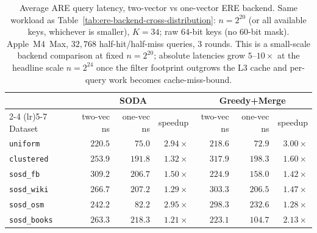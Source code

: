 \begin{table}[H]
    \centering
    \setlength{\tabcolsep}{5pt}
    \small
    \begin{tabular}{@{}lrrrrrr@{}}
        \toprule
        & \multicolumn{3}{c}{SODA} & \multicolumn{3}{c}{Greedy+Merge} \\
        \cmidrule(lr){2-4} \cmidrule(lr){5-7}
        Dataset
        & two-vec ns & one-vec ns & speedup
        & two-vec ns & one-vec ns & speedup \\
        \midrule
        \texttt{uniform}     & $220.5$ & $75.0$  & $2.94\times$ & $218.6$ & $72.9$  & $3.00\times$ \\
        \texttt{clustered}   & $253.9$ & $191.8$ & $1.32\times$ & $317.9$ & $198.3$ & $1.60\times$ \\
        \texttt{sosd\_fb}    & $309.2$ & $206.7$ & $1.50\times$ & $224.9$ & $158.0$ & $1.42\times$ \\
        \texttt{sosd\_wiki}  & $266.7$ & $207.2$ & $1.29\times$ & $303.3$ & $206.5$ & $1.47\times$ \\
        \texttt{sosd\_osm}   & $242.2$ & $82.2$  & $2.95\times$ & $298.3$ & $232.6$ & $1.28\times$ \\
        \texttt{sosd\_books} & $263.3$ & $218.3$ & $1.21\times$ & $223.1$ & $104.7$ & $2.13\times$ \\
        \bottomrule
    \end{tabular}
    \caption{Average ARE query latency, two-vector vs one-vector ERE backend.
    Same workload as Table~\ref{tab:ere-backend-cross-distribution}:
        $n = 2^{20}$ (or all available keys, whichever is smaller), $K = 34$;
        raw $64$-bit keys (no $60$-bit mask). Apple~M4~Max,
        $32{,}768$ half-hit/half-miss queries, $3$ rounds.
        This is a small-scale backend
        comparison at fixed $n = 2^{20}$; absolute latencies grow $5$--$10\times$
        at the headline scale $n = 2^{24}$ once the filter footprint outgrows
        the L3 cache and per-query work becomes cache-miss-bound.}
    \label{tab:ere-backend-query-latency}
\end{table}